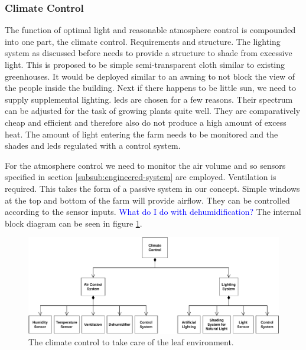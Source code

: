 \subsubsection{Climate Control}
The function of optimal light and reasonable atmosphere control is compounded into one part, the climate control.
Requirements and structure.
The lighting system as discussed before needs to provide a structure to shade from excessive light.
This is proposed to be simple semi-transparent cloth similar to existing greenhouses.
It would be deployed similar to an awning to not block the view of the people inside the building.
Next if there happens to be little sun, we need to supply supplemental lighting.
\acp{led} are chosen for a few reasons.
Their spectrum can be adjusted for the task of growing plants quite well.
They are comparatively cheap and efficient and therefore also do not produce a high amount of excess heat.
The amount of light entering the farm needs to be monitored and the shades and \acp{led} regulated with a control system.

For the atmosphere control we need to monitor the air volume and so sensors specified in section \ref{subsub:engineered-system} are employed.
Ventilation is required.
This takes the form of a passive system in our concept.
Simple windows at the top and bottom of the farm will provide airflow.
They can be controlled according to the sensor inputs.
\textcolor{Blue}{What do I do with dehumidification?}
The internal block diagram can be seen in figure \ref{fig:climate}.

\begin{figure}[htbp]
  \centering
  \caption{The climate control to take care of the leaf environment.}
  \label{fig:climate}
  \includegraphics[width=\textwidth]{img/architecture/climate.pdf}
\end{figure}

